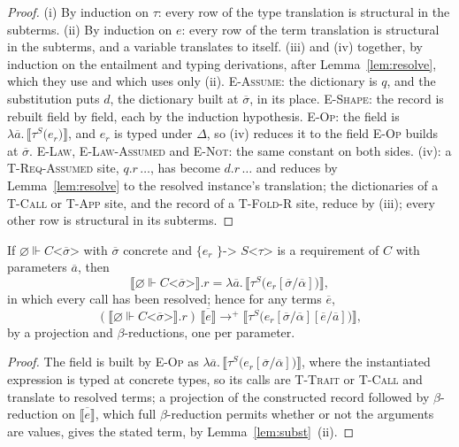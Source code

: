 \begin{proof}
(i) By induction on $\tau$: every row of the type translation is structural in the subterms.
(ii) By induction on $e$: every row of the term translation is structural in the subterms, and a variable translates to itself.
(iii) and (iv) together, by induction on the entailment and typing derivations, after Lemma~\ref{lem:resolve}, which they use and which uses only (ii).
\textsc{E-Assume}: the dictionary is $q$, and the substitution puts $d$, the dictionary built at $\overline{\sigma}$, in its place.
\textsc{E-Shape}: the record is rebuilt field by field, each by the induction hypothesis.
\textsc{E-Op}: the field is $\lambda\overline{a}.\,\llbracket \tau^{S}\texttt{(}e_r\texttt{)} \rrbracket$, and $e_r$ is typed under $\Delta$, so (iv) reduces it to the field \textsc{E-Op} builds at $\overline{\sigma}$.
\textsc{E-Law}, \textsc{E-Law-Assumed} and \textsc{E-Not}: the same constant on both sides.
(iv): a \textsc{T-Req-Assumed} site, $q.r\,\ldots$, has become $d.r\,\ldots$ and reduces by Lemma~\ref{lem:resolve} to the resolved instance's translation; the dictionaries of a \textsc{T-Call} or \textsc{T-App} site, and the record of a \textsc{T-Fold-R} site, reduce by (iii); every other row is structural in its subterms.
\end{proof}

\begin{lemma}
\label{lem:resolve}
If $\varnothing \Vdash C\texttt{<}\overline{\sigma}\texttt{>}$ with $\overline{\sigma}$ concrete and $\texttt{\{ }e_r\texttt{ \} -> }S\texttt{<}\tau\texttt{>}$ is a requirement of $C$ with parameters $\overline{a}$, then
\[ \llbracket \varnothing \Vdash C\texttt{<}\overline{\sigma}\texttt{>} \rrbracket.r = \lambda\overline{a}.\,\llbracket \tau^{S}\texttt{(}e_r[\overline{\sigma}/\overline{\alpha}]\texttt{)} \rrbracket, \]
in which every call has been resolved; hence for any terms $\overline{e}$,
\[ (\llbracket \varnothing \Vdash C\texttt{<}\overline{\sigma}\texttt{>} \rrbracket.r)\,\overline{\llbracket e \rrbracket} \longrightarrow^{+} \llbracket \tau^{S}\texttt{(}e_r[\overline{\sigma}/\overline{\alpha}][\overline{e}/\overline{a}]\texttt{)} \rrbracket, \]
by a projection and $\beta$-reductions, one per parameter.
\end{lemma}

\begin{proof}
The field is built by \textsc{E-Op} as $\lambda\overline{a}.\,\llbracket \tau^{S}\texttt{(}e_r[\overline{\sigma}/\overline{\alpha}]\texttt{)} \rrbracket$, where the instantiated expression is typed at concrete types, so its calls are \textsc{T-Trait} or \textsc{T-Call} and translate to resolved terms; a projection of the constructed record followed by $\beta$-reduction on $\overline{\llbracket e \rrbracket}$, which full $\beta$-reduction permits whether or not the arguments are values, gives the stated term, by Lemma~\ref{lem:subst}~(ii).
\end{proof}

